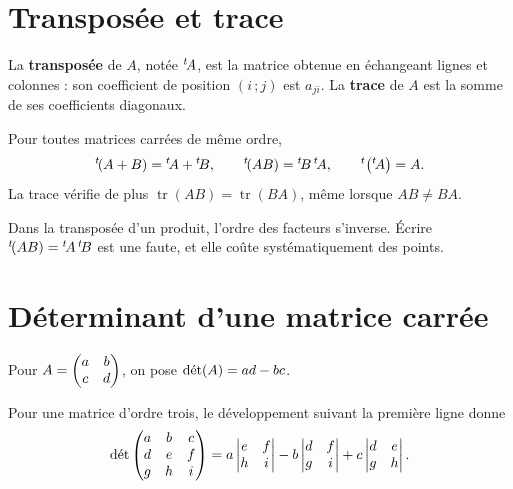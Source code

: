 \section{Transposée et trace}

\begin{definition}
La \textbf{transposée} de $A$, notée ${}^{t}\!A$, est la matrice obtenue en
échangeant lignes et colonnes : son coefficient de position $(i\,;j)$ est
$a_{ji}$. La \textbf{trace} de $A$ est la somme de ses coefficients
diagonaux.
\end{definition}

\begin{propriete}
Pour toutes matrices carrées de même ordre,
\[
  \transpo{(A+B)} = \transpo{A}+\transpo{B}, \qquad
  \transpo{(AB)} = \transpo{B}\,\transpo{A}, \qquad
  \transpo{\left(\transpo{A}\right)} = A .
\]
La trace vérifie de plus $\operatorname{tr}(AB) = \operatorname{tr}(BA)$, même
lorsque $AB \neq BA$.
\end{propriete}

\begin{avertissement}
Dans la transposée d'un produit, l'ordre des facteurs s'inverse. Écrire
${}^{t}\!(AB) = {}^{t}\!A\,{}^{t}\!B$ est une faute, et elle coûte
systématiquement des points.
\end{avertissement}

\section{Déterminant d'une matrice carrée}

\begin{definition}
Pour $A = \begin{pmatrix} a & b \\ c & d \end{pmatrix}$, on pose $\operatorname{d\acute{e}t}(A) = ad-bc$.

Pour une matrice d'ordre trois, le développement suivant la première ligne
donne
\[
  \operatorname{d\acute{e}t}
  \begin{pmatrix} a & b & c \\ d & e & f \\ g & h & i \end{pmatrix}
  = a\begin{vmatrix} e & f \\ h & i \end{vmatrix}
  - b\begin{vmatrix} d & f \\ g & i \end{vmatrix}
  + c\begin{vmatrix} d & e \\ g & h \end{vmatrix}.
\]
\end{definition}

